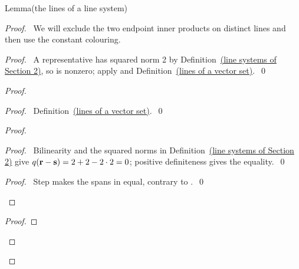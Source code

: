 \begin{mergedproofsection}
\begin{namedresult}{Lemma}{(the lines of a line system)}\label{lem:312-bridge}
\end{namedresult}
\begin{proof}
\pfsketch\ We will exclude the two endpoint inner products on distinct
lines and then use the constant colouring.
\begin{proof}\pf\ A representative has squared norm 2 by
Definition~\hyperref[def:line-system]{(line systems of Section 2)}, so is nonzero; apply
 and Definition~\hyperref[def:312-root-lines]{(lines of a vector set)}.~\qed\end{proof}
\begin{proof}
 \begin{proof}\pf\ Definition~\hyperref[def:312-root-lines]{(lines of a vector set)}.~\qed\end{proof}
 \begin{proof}
  \begin{proof}\pf\ Bilinearity and the squared norms in
  Definition~\hyperref[def:line-system]{(line systems of Section 2)} give $q({\mathbf r}-{\mathbf s})=2+2-2\cdot2=0$;
  positive definiteness gives the equality.~\qed\end{proof}
  \qedstep
  \begin{proof}\pf\ Step  makes the spans
  in  equal, contrary to .~\qed\end{proof}
 \end{proof}
 \begin{proof}

\end{proof}
\end{proof}
\end{proof}
\end{mergedproofsection}
